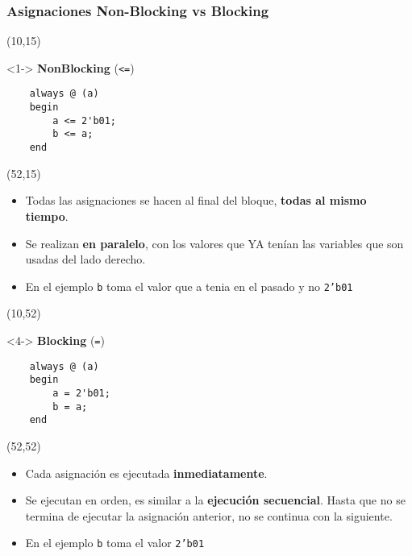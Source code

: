 \documentclass[aspectratio=169]{beamer}
\begin{document}
\begin{frame}[fragile,t]
    \frametitle{Asignaciones Non-Blocking vs Blocking}
    \begin{textblock}{40}(10,15)
    \begin{onlyenv}<1->
    \textbf{NonBlocking} {\Large (\textcolor{naranjauca}{\texttt{<=}})}
\begin{lstlisting}
    always @ (a)
    begin
        a <= 2'b01;
        b <= a;
    end
\end{lstlisting}
    \end{onlyenv}
    \end{textblock}
    \begin{textblock}{90}(52,15)
    \begin{itemize}
     \item<1-> Todas las asignaciones se hacen al final del bloque, \textbf{todas al mismo tiempo}.
     \item<2-> Se realizan \textbf{en paralelo}, con los valores que YA tenían las variables que son usadas del lado derecho.
     \item<3-> \textcolor{verdeuca}{En el ejemplo \texttt{b} toma el valor que a tenia en el pasado y no \texttt{2'b01}}
    \end{itemize}
    \end{textblock}

    \begin{textblock}{40}(10,52)
    \begin{onlyenv}<4->
    \textbf{Blocking} {\Large (\textcolor{naranjauca}{\texttt{=}})}
\begin{lstlisting}
    always @ (a)
    begin
        a = 2'b01;
        b = a;
    end
\end{lstlisting}
    \end{onlyenv}
    \end{textblock}
    \begin{textblock}{90}(52,52)
    \begin{itemize}
    \item<4-> Cada asignación es ejecutada \textbf{inmediatamente}.
    \item<5-> Se ejecutan en orden, es similar a la \textbf{ejecución secuencial}. Hasta que no se termina de ejecutar la asignación anterior, no se continua con la siguiente.
    \item<6-> \textcolor{verdeuca}{En el ejemplo \texttt{b} toma el valor \texttt{2'b01}}
    \end{itemize}
    \end{textblock}
\end{frame}
\end{document}
